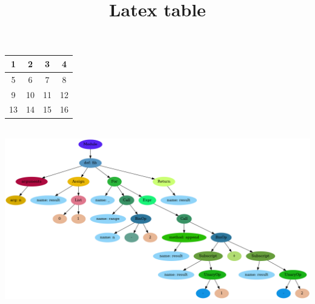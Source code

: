 \documentclass{article}
\title{{Latex table}}
\begin{document}
\maketitle

\begin{tabular}{| c | c | c | c |}
\hline
1 & 2 & 3 & 4 \\
\hline
5 & 6 & 7 & 8 \\
\hline
9 & 10 & 11 & 12 \\
\hline
13 & 14 & 15 & 16\\
\hline
\end{tabular}
\newline\newline\\
\includegraphics[scale=0.3]{ast.png}\\
\end{document}
